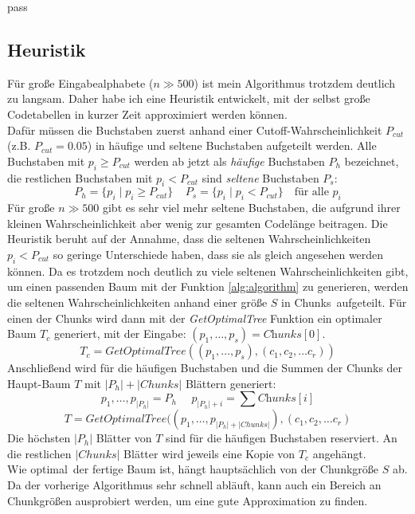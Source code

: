 pass\documentclass[a4paper,10pt,ngerman]{scrartcl}
\begin{document}
    \subsection{Heuristik}
    Für große Eingabealphabete ($n \gg 500$) ist mein Algorithmus trotzdem deutlich zu langsam.
    Daher habe ich eine Heuristik entwickelt, mit der selbst große Codetabellen in kurzer Zeit approximiert werden können. \\
    Dafür müssen die Buchstaben zuerst anhand einer Cutoff-Wahrscheinlichkeit $P_{cut}$ (z.B. $P_{cut} = 0.05$) in häufige und seltene Buchstaben aufgeteilt werden.
    Alle Buchstaben mit $p_i \ge P_{cut}$ werden ab jetzt als \textit{häufige} Buchstaben $P_h$ bezeichnet, die restlichen Buchstaben mit $p_i < P_{cut}$ sind \textit{seltene} Buchstaben $P_s$:
    \[P_{h} = \{p_i \mid p_i \ge P_{cut}\}~~~~~P_s = \{p_i \mid p_i < P_{cut}\} \text{~~~für alle $p_i$}\]
    Für große $n \gg 500$ gibt es sehr viel mehr seltene Buchstaben, die aufgrund ihrer kleinen Wahrscheinlichkeit aber wenig zur gesamten Codelänge beitragen.
    Die Heuristik beruht auf der Annahme, dass die seltenen Wahrscheinlichkeiten $p_i < P_{cut}$ so geringe Unterschiede haben, dass sie als gleich angesehen werden können.
    Da es trotzdem noch deutlich zu viele seltenen Wahrscheinlichkeiten gibt, um einen passenden Baum mit der Funktion \ref{alg:algorithm} zu generieren, werden die seltenen Wahrscheinlichkeiten anhand einer größe $S$ in \glqq Chunks\grqq~aufgeteilt.
    Für einen der Chunks wird dann mit der \textit{GetOptimalTree} Funktion ein optimaler Baum $T_c$ generiert, mit der Eingabe: $(p_1, \dots, p_s) = \textit{Chunks}[0]$.
    \[T_c = \textit{GetOptimalTree}((p_1, \dots, p_s), (c_1, c_2, \dots c_r))\]
    Anschließend wird für die häufigen Buchstaben und die Summen der Chunks der Haupt-Baum $T$ mit $|P_h| + |Chunks|$ Blättern generiert:
    \[p_1, \dots, p_{|P_h|} = P_h~~~~~~p_{|P_h| + i} = \sum \textit{Chunks}[i]\]
    \[T = \textit{GetOptimalTree}((p_1, \dots, p_{|P_h| + |Chunks|}), (c_1, c_2, \dots c_r)\]
    Die höchsten $|P_h|$ Blätter von $T$ sind für die häufigen Buchstaben \glqq reserviert\grqq.
    An die restlichen $|Chunks|$ Blätter wird jeweils eine Kopie von $T_c$ angehängt. \\
    Wie \glqq optimal\grqq~der fertige Baum ist, hängt hauptsächlich von der Chunkgröße $S$ ab.
    Da der vorherige Algorithmus sehr schnell abläuft, kann auch ein Bereich an Chunkgrößen ausprobiert werden, um eine gute Approximation zu finden.
\end{document}
